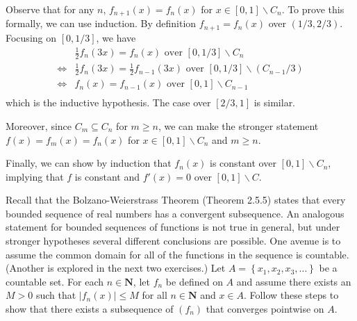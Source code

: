 \begin{solution}
{  Observe that for any \(n\), \(f_{n+1}(x) = f_n(x)\) for \(x \in [0,1]\backslash C_n\). To prove this formally, we can use induction. By definition \(f_{n+1} = f_n(x)\) over \((1/3, 2/3)\). Focusing on \([0, 1/3]\), we have
\begin{align*}
   &\frac{1}{2} f_n(3x) = f_n(x) \text{ over } [0,1/3] \backslash C_n\\
   \Longleftrightarrow &\frac{1}{2} f_n(3x) = \frac{1}{2}f_{n-1}(3x) \text{ over } [0, 1/3] \backslash \left(C_{n-1} / 3\right)\\
   \Longleftrightarrow & f_n(x) = f_{n-1}(x) \text{ over } [0,1] \backslash C_{n-1}\\
\end{align*}
which is the inductive hypothesis. The case over \([2/3, 1]\) is similar.

Moreover, since \(C_m \subseteq C_n\) for \(m \geq n\), we can make the stronger statement \(f(x) = f_{m}(x) = f_n(x)\) for \(x \in [0,1]\backslash C_n\) and \(m \geq n\).

Finally, we can show by induction that \(f_n(x)\) is constant over \([0,1]\backslash C_n\), implying that \(f\) is constant and \(f'(x) = 0\) over \([0,1] \backslash C\).
  }

\end{solution}
\begin{exercise}
  Recall that the Bolzano-Weierstrass Theorem (Theorem 2.5.5) states that every bounded sequence of real numbers has a convergent subsequence. An analogous statement for bounded sequences of functions is not true in general, but under stronger hypotheses several different conclusions are possible. One avenue is to assume the common domain for all of the functions in the sequence is countable. (Another is explored in the next two exercises.)
  Let $A=\left\{x_{1}, x_{2}, x_{3}, \ldots\right\}$ be a countable set. For each $n \in \mathbf{N}$, let $f_{n}$ be defined on $A$ and assume there exists an $M>0$ such that $\left|f_{n}(x)\right| \leq M$ for all $n \in \mathbf{N}$ and $x \in A$. Follow these steps to show that there exists a subsequence of $\left(f_{n}\right)$ that converges pointwise on $A$.

\end{exercise}
